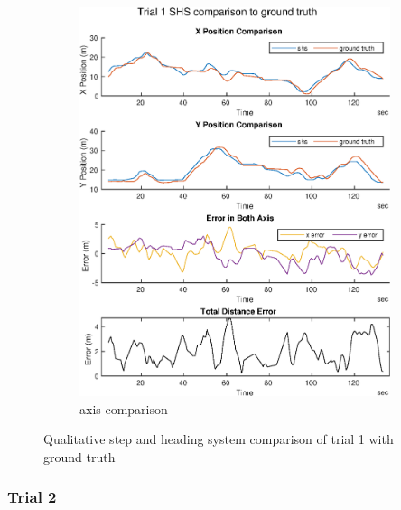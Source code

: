 \begin{figure}[H]
\begin{subfigure}[t]{.45\textwidth}
		\includegraphics[width=\linewidth]{images/20201029_1040_trial1_shs_2}
		\caption{axis comparison}
		\label{fig:trial1_comparison}
	\end{subfigure}
	\caption{Qualitative step and heading system comparison of trial 1 with ground truth}
	\label{fig:trial1_shs_gt_comparison}
\end{figure}

\subsubsection{Trial 2}

